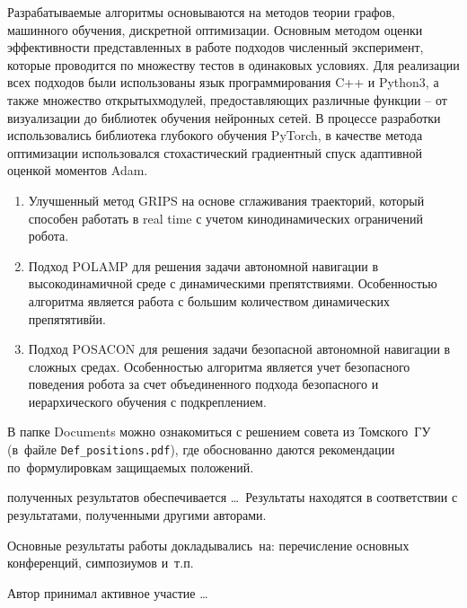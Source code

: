 {\methods}
Разрабатываемые алгоритмы основываются на методов теории графов, машинного обучения, дискретной оптимизации. Основным методом оценки эффективности
представленных в работе подходов численный эксперимент, которые проводится по множеству тестов в одинаковых условиях. 
Для реализации всех подходов были использованы язык программирования C++ и Python3, а также множество открытыхмодулей, предоставляющих различные 
функции – от визуализации до библиотек обучения нейронных сетей. В процессе разработки использовались библиотека глубокого обучения PyTorch, 
в качестве метода оптимизации использовался стохастический градиентный спуск адаптивной оценкой моментов Adam. 

{}
\begin{enumerate}[beginpenalty=10000] %
  \item Улучшенный метод GRIPS на основе сглаживания траекторий, который способен работать в real time с учетом кинодинамических ограничений 
  робота.
  \item Подход POLAMP для решения задачи автономной навигации в высокодинамичной среде с динамическими препятствиями. Особенностью алгоритма 
  является работа с большим количеством динамических препятятивйи.
  \item Подход POSACON для решения задачи безопасной автономной навигации в сложных средах. Особенностью алгоритма является учет безопасного 
  поведения робота за счет объединенного подхода безопасного и иерархического обучения с подкреплением.

\end{enumerate}
В папке Documents можно ознакомиться с решением совета из Томского~ГУ
(в~файле \verb+Def_positions.pdf+), где обоснованно даются рекомендации
по~формулировкам защищаемых положений.

{\reliability} полученных результатов обеспечивается \ldots \ Результаты находятся в соответствии с результатами, полученными другими авторами.


{\probation}
Основные результаты работы докладывались~на:
перечисление основных конференций, симпозиумов и~т.\:п.

{\contribution} Автор принимал активное участие \ldots

